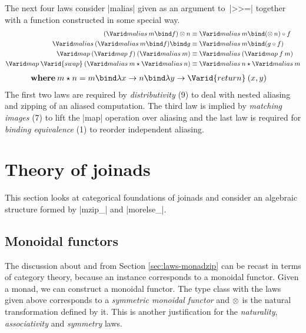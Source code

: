 \documentclass{sigplanconf}
\begin{document}
The next four laws consider |malias| given as an argument to~|>>=| together with a function constructed
in some special way. 
\begin{align*}
(\malias \: m \bind f) \mzip n &\equiv \malias \: m \bind (\mzip \: n) \circ f \\ %
\malias \: (\malias \: m \bind f) \bind g &\equiv \malias \: m \bind (g \circ f) \\ %
\map \: (\map \: f) \: (\malias \: m) &\equiv \malias \: (\map \: f \: m) \\ %
\map \: \Varid{swap} \: (\malias \: m \star \malias \: n) &\equiv \malias \: n \star \malias \: m 
\end{align*}
\begin{align*}
  \textbf{where} \: &m \star n = m \bind \lambda x \rightarrow n \bind \lambda y \rightarrow \Varid{return} \: (x, y)
\end{align*}
The first two laws are required by \textit{distributivity} (9) to 
deal with nested aliasing and zipping of an aliased computation. The third law is implied by
\textit{matching images} (7) to lift the |map| operation over aliasing and the last law is required
for \textit{binding equivalence} (1) to reorder independent aliasing.


\section{Theory of joinads}
\label{sec:theory}

This section looks at categorical foundations of joinads and consider an algebraic structure
formed by |mzip_| and |morelse_|.


\subsection{Monoidal functors}
\label{sec:theory-monoidal}

The discussion about  and  from Section \ref{sec:laws-monadzip}
can be recast in terms of category theory, because an  instance corresponds to a 
monoidal functor. Given a monad, we can construct a monoidal functor. The 
 type class with the laws given above corresponds to a \textit{symmetric monoidal 
functor} and $\otimes$ is the natural transformation defined by it. This is another justification for 
the \textit{naturality}, \textit{associativity} and \textit{symmetry} laws. 
\end{document}
